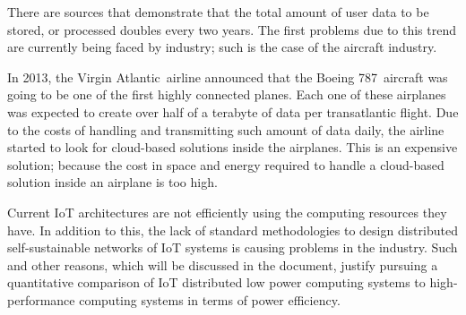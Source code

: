 There are sources that demonstrate that the total amount of user data to be
stored, or processed doubles every two years. The first problems due to this
trend are currently being faced by industry; such is the case of the aircraft
industry.

In 2013, the Virgin Atlantic\textregistered\  airline announced that the Boeing
787\textregistered\  aircraft was going to be one of the first highly connected
planes. Each one of these airplanes was expected to create over half of a
terabyte of data per transatlantic flight. Due to the costs of handling and
transmitting such amount of data daily, the airline started to look for
cloud-based solutions inside the airplanes. This is an expensive solution;
because the cost in space and energy required to handle a cloud-based solution
inside an airplane is too high. 

Current IoT architectures are not efficiently using the computing resources
they have. In addition to this, the lack of standard methodologies to design
distributed self-sustainable networks of IoT systems is causing problems in the
industry. Such and other reasons, which will be discussed in the document,
justify pursuing a quantitative comparison of IoT distributed low power
computing systems to high-performance computing systems in terms of power
efficiency. 

\clearpage
